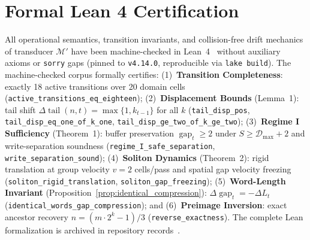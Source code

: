 \documentclass[journal,10pt,twocolumn]{IEEEtran}
\DeclareMathOperator{\tail}{tail}
\DeclareMathOperator{\gap}{gap}
\begin{document}
\section{Formal Lean 4 Certification}
\label{sec:lean_verification}
\begin{sloppypar}
All operational semantics, transition invariants, and collision-free drift mechanics of transducer $\mathcal{M}'$ have been machine-checked in Lean~4~\cite{moura2021} without auxiliary axioms or \texttt{sorry} gaps (pinned to \texttt{v4.14.0}, reproducible via \texttt{lake build}). The machine-checked corpus formally certifies:
(1)~\textbf{Transition Completeness}: exactly 18 active transitions over 20 domain cells (\texttt{active\_\allowbreak transitions\_\allowbreak eq\_\allowbreak eighteen});
(2)~\textbf{Displacement Bounds} (Lemma~1): tail shift $\Delta \tail(n, t) = \max\{1, k_{t-1}\}$ for all $k$ (\texttt{tail\_\allowbreak disp\_\allowbreak pos}, \texttt{tail\_\allowbreak disp\_\allowbreak eq\_\allowbreak one\_\allowbreak of\_\allowbreak k\_\allowbreak one}, \texttt{tail\_\allowbreak disp\_\allowbreak ge\_\allowbreak two\_\allowbreak of\_\allowbreak k\_\allowbreak ge\_\allowbreak two});
(3)~\textbf{Regime I Sufficiency} (Theorem~1): buffer preservation $\gap_t \ge 2$ under $S \ge \mathcal{D}_{\max} + 2$ and write-separation soundness (\texttt{regime\_\allowbreak I\_\allowbreak safe\_\allowbreak separation}, \texttt{write\_\allowbreak separation\_\allowbreak sound});
(4)~\textbf{Soliton Dynamics} (Theorem~2): rigid translation at group velocity $v = 2$ cells/pass and spatial gap velocity freezing (\texttt{soliton\_\allowbreak rigid\_\allowbreak translation}, \texttt{soliton\_\allowbreak gap\_\allowbreak freezing});
(5)~\textbf{Word-Length Invariant} (Proposition~\ref{prop:identical_compression}): $\Delta\gap_t = -\Delta L_t$ (\texttt{identical\_\allowbreak words\_\allowbreak gap\_\allowbreak compression}); and
(6)~\textbf{Preimage Inversion}: exact ancestor recovery $n = (m \cdot 2^k - 1)/3$ (\texttt{reverse\_\allowbreak exactness}).
The complete Lean formalization is archived in repository records~\cite{varshney2026notes}.
\end{sloppypar}
\end{document}

